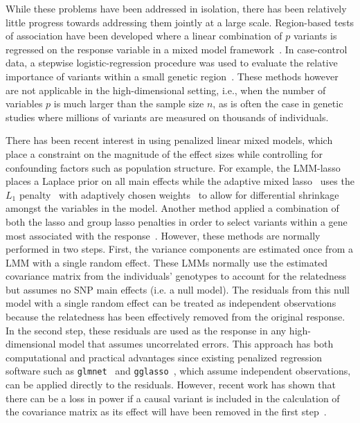 While these problems have been addressed in isolation, there has been relatively little progress towards addressing them jointly at a large scale. 
Region-based tests of association have been developed where a linear combination of $p$ variants is regressed on the response variable in a mixed model framework~\citep{oualkacha2013adjusted}. 
In case-control data, a stepwise logistic-regression procedure was used to evaluate the relative importance of variants within a small genetic region~\citep{cordell2002unified}. 
These methods however are not applicable in the high-dimensional setting, i.e., when the number of variables $p$ is much larger than the sample size $n$, as is often the case in genetic studies where millions of variants are measured on thousands of individuals.

There has been recent interest in using penalized linear mixed models, which place a constraint on the magnitude of the effect sizes while controlling for confounding factors such as population structure. 
For example, the LMM-lasso~\citep{rakitsch2013lasso} places a Laplace prior on all main effects while the adaptive mixed lasso~\citep{wang2011identifying} uses the $L_1$ penalty~\citep{tibshirani1996regression} with adaptively chosen weights~\citep{zou2006adaptive} to allow for differential shrinkage amongst the variables in the model. 
Another method applied a combination of both the lasso and group lasso penalties in order to select variants within a gene most associated with the response~\citep{ding20142}. 
However, these methods are normally performed in two steps. First, the variance components are estimated once from a LMM with a single random effect. These LMMs normally use the estimated covariance matrix from the individuals' genotypes to account for the relatedness but assumes no SNP main effects (i.e. a null model). 
The residuals from this null model with a single random effect can be treated as independent observations because the relatedness has been effectively removed from the original response. 
In the second step, these residuals are used as the response in any high-dimensional model that assumes uncorrelated errors.  
This approach has both computational and practical advantages since existing penalized regression software such as \texttt{glmnet}~\citep{friedman2010regularization} and \texttt{gglasso}~\citep{yang2015fast}, which assume independent observations, can be applied directly to the residuals. 
However, recent work has shown that there can be a loss in power if a causal variant is included in the calculation of the covariance matrix as its effect will have been removed in the first step~\citep{oualkacha2013adjusted,yang2014advantages}. 

